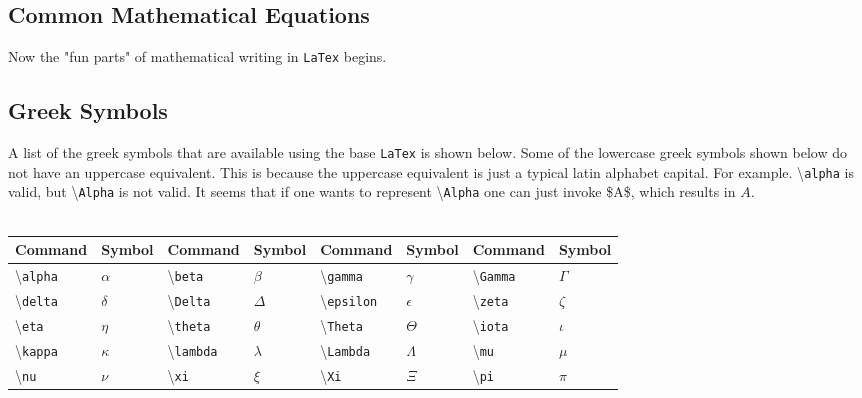 \documentclass[a4paper, 12pt]{report}
\def\tabsize{1.9cm}
\def\ltabsize{1.4cm}
\begin{document}
\begin{center}
\section{Common Mathematical Equations}
\begin{comment}
\end{comment}
Now the "fun parts" of mathematical writing in \texttt{LaTex} begins.

\subsection{Greek Symbols}
\begin{comment}
\end{comment}
A list of the greek symbols that are available using the base \texttt{LaTex} is shown below. Some of the lowercase greek symbols shown below do not have an uppercase equivalent. This is because the uppercase equivalent is just a typical latin alphabet capital. For example. \textbackslash \texttt{alpha} is valid, but \textbackslash \texttt{Alpha} is not valid. It seems that if one wants to represent \textbackslash \texttt{Alpha} one can just invoke \$A\$, which results in $A$.
\\~\\\begin{tabular}{|m{\tabsize}|m{\ltabsize}|m{\tabsize}|m{\ltabsize}|m{\tabsize}|m{\ltabsize}|m{\tabsize}|m{\ltabsize}|}
\hline
Command & Symbol & Command & Symbol & Command & Symbol & Command & Symbol \\ \hline
\textbackslash \texttt{alpha}  & $\alpha$ & \textbackslash \texttt{beta}  & $\beta$ & \textbackslash \texttt{gamma}  & $\gamma$ & \textbackslash \texttt{Gamma} & $\Gamma$ \\ \hline
\textbackslash \texttt{delta}  & $\delta$ & \textbackslash \texttt{Delta} & $\Delta$ & \textbackslash \texttt{epsilon} & $\epsilon$ & \textbackslash \texttt{zeta} & $\zeta$ \\ \hline
\textbackslash \texttt{eta} & $\eta$ & \textbackslash \texttt{theta} & $\theta$ & \textbackslash \texttt{Theta}  & $\Theta$ & \textbackslash \texttt{iota} & $\iota$ \\ \hline
\textbackslash \texttt{kappa}  & $\kappa$ & \textbackslash \texttt{lambda} & $\lambda$ & \textbackslash \texttt{Lambda} & $\Lambda$ & \textbackslash \texttt{mu}  & $\mu$ \\ \hline
\textbackslash \texttt{nu} & $\nu$ & \textbackslash \texttt{xi} & $\xi$ & \textbackslash \texttt{Xi} & $\Xi$ & \textbackslash \texttt{pi} & $\pi$ \\ \hline

\end{tabular}
\end{center}
\end{document}
